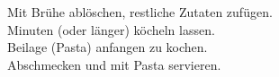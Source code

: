 \begin{recipe}
{    \step%
    Mit Brühe ablöschen, restliche Zutaten zufügen.\\
    
     Minuten (oder länger) köcheln lassen.\\
    
    \step%
    Beilage (Pasta) anfangen zu kochen.\\
    
    \step%
    Abschmecken und mit Pasta servieren.
}



\end{recipe}